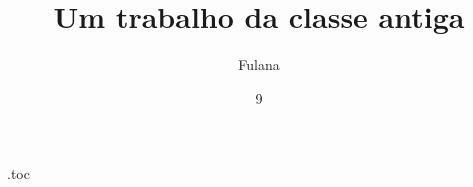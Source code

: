 \begin{filecontents*}[overwrite]{\jobname.toc}
%
\end{filecontents*}
\documentclass[dsc]{coppe}
\renewcommand\coppefinalmanual{\emph{Norma Antiga de Teste}}

\title{Um trabalho da classe antiga}
\author{Fulana}{de Tal}
\date{9}{2026}
\maketitle
\frontmatter
\begin{abstract}
Texto do resumo.
\end{abstract}
\listofmapas
\tableofcontents
\mainmatter
\chapter{Introdução}
Texto.
\begin{mapa}[h]
  \caption{Um mapa}
  \centering Mapa.
\end{mapa}
\coppetexfinalpage

